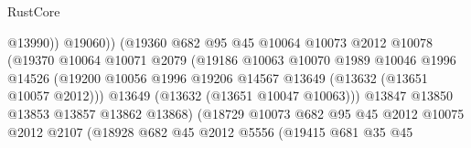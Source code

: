 \begin{lexlean}{RustCore}
\begin{coremodule}
                                            @13990))
                                        @19060))
                                    (@19360
                                      @682
                                      @95
                                      @45
                                      @10064
                                      @10073
                                      @2012
                                      @10078
                                      (@19370
                                        @10064
                                        @10071
                                        @2079
                                        (@19186
                                          @10063
                                          @10070
                                          @1989
                                          @10046
                                          @1996
                                          @14526
                                          (@19200
                                            @10056
                                            @1996
                                            @19206
                                            @14567
                                            @13649
                                            (@13632 (@13651 @10057 @2012)))
                                          @13649
                                          (@13632 (@13651 @10047 @10063)))
                                        @13847
                                        @13850
                                        @13853
                                        @13857
                                        @13862
                                        @13868)
                                      (@18729
                                        @10073
                                        @682
                                        @95
                                        @45
                                        @2012
                                        @10075
                                        @2012
                                        @2107
                                        (@18928
                                          @682
                                          @45
                                          @2012
                                          @5556
                                          (@19415
                                            @681
                                            @35
                                            @45

\end{coremodule}
\end{lexlean}
